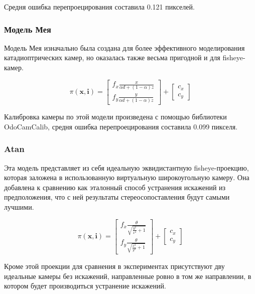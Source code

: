 Средня ошибка перепроецирования составила 0.121 пикселей. %

\subsubsection{Модель Мея}

Модель Мея \cite{mei} изначально была создана для более эффективного моделирования катадиоптрических камер, но оказалась также весьма
пригодной и для fisheye-камер. 

\begin{equation}
\pi(\mathbf{x}, \mathbf{i})=\left[\begin{array}{l}
	f_{x} \frac{x}{\alpha d+(1-\alpha) z} \\
	f_{y} \frac{y}{\alpha d+(1-\alpha) z}
	\end{array}\right]+\left[\begin{array}{l}
	c_{x} \\
	c_{y}
	\end{array}\right]
\end{equation}

Калибровка камеры по этой модели произведена с помощью библиотеки OdoCamCalib, средня ошибка перепроецирования 
составила 0.099 пикселя.

\subsubsection{Atan}

Эта модель представляет из себя идеальную эквидистантную fisheye-проекцию, которая заложена в использованную виртуальную широкоугольную камеру. 
Она добавлена к сравнению как эталонный способ устранения искажений из предположения, что с ней результаты стереосопоставления будут 
самыми лучшими.  

\begin{equation}
	\pi(\mathbf{x}, \mathbf{i})=\left[\begin{array}{l}
		f_{x} \frac{\theta}{ \sqrt{ \frac{y^2}{x^2} + 1 }} \\
		f_{y} \frac{\theta}{ \sqrt{ \frac{x^2}{y^2} + 1 }}
		\end{array}\right]+\left[\begin{array}{l}
		c_{x} \\
		c_{y}
		\end{array}\right]
	\end{equation}

Кроме этой проекции для сравнения в экспериментах присутствуют дву идеальные камеры без искажений, направленные
ровно в том же направлении, в котором будет производиться устранение  искажений.  

